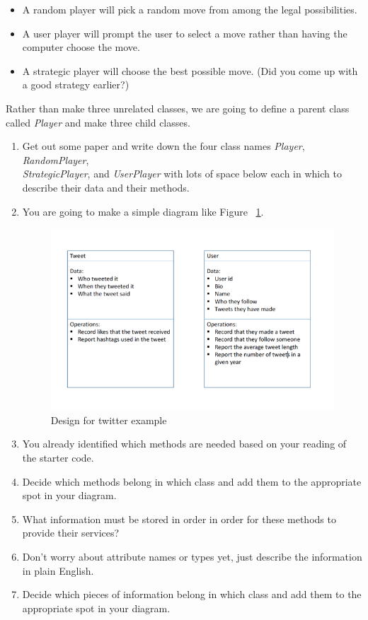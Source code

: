 \documentclass[12pt]{article}
\begin{document}
\bigskip

\begin{itemize}
    \item A random player will pick a random move from among the legal possibilities.
    \item A user player will prompt the user to select a move rather than having
    the computer choose the move.
    \item A strategic player will choose the best possible move.
    (Did you come up with a good strategy earlier?)
\end{itemize}

\bigskip

\noindent Rather than make three unrelated classes, we are going to define a parent class
called \textit{Player} and make three child classes.

\bigskip

\begin{enumerate}[1.]
\item Get out some paper and write down the four class names \textit{Player},
\textit{RandomPlayer},\\ \textit{StrategicPlayer}, and \textit{UserPlayer} with lots
of space below each in which to describe their data and their methods.
\item You are going to make a simple diagram like Figure ~\ref{fig:uml}.

\begin{figure}
    \begin{center}
    \includegraphics[width=0.8\linewidth]{../images/lab_3/uml.png}
    \end{center}
    \caption{Design for twitter example}
    \label{fig:uml}
\end{figure}

\item You already identified which methods are needed based on your reading of the
starter code.
\item Decide which methods belong in which class and add them to the appropriate
spot in your diagram.
\item What information must be stored in order in order for these methods to provide
their services?
\item Don’t worry about attribute names or types yet, just describe the information
in plain English.
\item Decide which pieces of information belong in which class and add them to the
appropriate spot in your diagram.
\end{enumerate}
\end{document}
